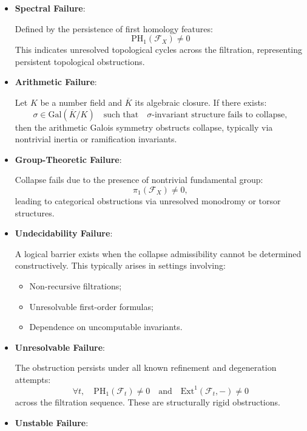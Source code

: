 \documentclass[11pt]{article}
\begin{document}
\begin{itemize}
    \item \textbf{Spectral Failure}:
    
    Defined by the persistence of first homology features:
    \[
    \mathrm{PH}_1(\mathcal{F}_X) \neq 0
    \]
    This indicates unresolved topological cycles across the filtration, representing persistent topological obstructions.

    \item \textbf{Arithmetic Failure}:
    
    Let \( K \) be a number field and \( \overline{K} \) its algebraic closure. If there exists:
    \[
    \sigma \in \mathrm{Gal}(\overline{K}/K) \quad \text{such that} \quad \sigma\text{-invariant structure fails to collapse},
    \]
    then the arithmetic Galois symmetry obstructs collapse, typically via nontrivial inertia or ramification invariants.

    \item \textbf{Group-Theoretic Failure}:
    
    Collapse fails due to the presence of nontrivial fundamental group:
    \[
    \pi_1(\mathcal{F}_X) \neq 0,
    \]
    leading to categorical obstructions via unresolved monodromy or torsor structures.

    \item \textbf{Undecidability Failure}:
    
    A logical barrier exists when the collapse admissibility cannot be determined constructively. This typically arises in settings involving:
    \begin{itemize}
        \item Non-recursive filtrations;
        \item Unresolvable first-order formulas;
        \item Dependence on uncomputable invariants.
    \end{itemize}

    \item \textbf{Unresolvable Failure}:
    
    The obstruction persists under all known refinement and degeneration attempts:
    \[
    \forall t, \quad \mathrm{PH}_1(\mathcal{F}_t) \neq 0 \quad \text{and} \quad \mathrm{Ext}^1(\mathcal{F}_t, -) \neq 0
    \]
    across the filtration sequence. These are structurally rigid obstructions.

    \item \textbf{Unstable Failure}:
    

\end{itemize}
\end{document}
